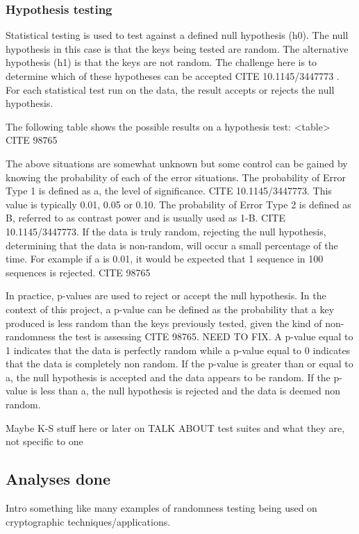 \subsubsection{Hypothesis testing}

Statistical testing is used to test against a defined null hypothesis (h0). The null hypothesis in this case is that the keys being tested are random. The alternative hypothesis (h1) is that the keys are not random. The challenge here is to determine which of these hypotheses can be accepted CITE 10.1145/3447773 . For each statistical test run on the data, the result accepts or rejects the null hypothesis. \par

The following table shows the possible results on a hypothesis test:
 <table> CITE 98765 \par

The above situations are somewhat unknown but some control can be gained by knowing the probability of each of the error situations. The probability of Error Type 1 is defined as a, the level of significance. CITE 10.1145/3447773. This value is typically 0.01, 0.05 or 0.10. The probability of Error Type 2 is defined as B, referred to as contrast power and is usually used as 1-B. CITE 10.1145/3447773. If the data is truly random, rejecting the null hypothesis, determining that the data is non-random, will occur a small percentage of the time. For example if a is 0.01, it would be expected that 1 sequence in 100 sequences is rejected.  CITE 98765\par

In practice, p-values are used to reject or accept the null hypothesis. In the context of this project, a p-value can be defined as the probability that a key produced is less random than the keys previously tested, given the kind of non-randomness the test is assessing CITE 98765. NEED TO FIX. A p-value equal to 1 indicates that the data is perfectly random while a p-value equal to 0 indicates that the data is completely non random. If the p-value is greater than or equal to a, the null hypothesis is accepted and the data appears to be random. If the p-value is less than a, the null hypothesis is rejected and the data is deemed non random. \par

Maybe K-S stuff here or later on
TALK ABOUT test suites and what they are, not specific to one

\subsection{Analyses done}
Intro something like many examples of randomness testing being used on cryptographic techniques/applications. \par

